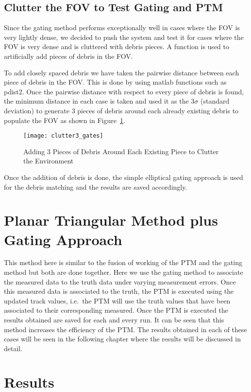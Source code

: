 \documentclass[]{aiaa-tc}%
\begin{document}
\subsection{Clutter the FOV to Test Gating and PTM}

Since the gating method performs exceptionally well in cases where the FOV is very lightly dense, we decided to push the system and test it for cases where the FOV is very dense and is cluttered with debris pieces. A function is used to artificially add pieces of debris in the FOV. 

To add closely spaced debris we have taken the pairwise distance between each piece of debris in the FOV. This is done by using matlab functions such as pdist2. Once the pairwise distance with respect to every piece of debris is found, the minimum distance in each case is taken and used it as the $3\sigma$ (standard deviation) to generate $3$ pieces of debris around each already existing debris to populate the FOV as shown in Figure~\ref{clutter}.
\begin{figure}[h]
\centering
\texttt{[image: clutter3\_gates]}
\caption{Adding 3 Pieces of Debris Around Each Existing Piece to Clutter the Environment}
\label{clutter}
\end{figure}
Once the addition of debris is done, the simple elliptical gating approach is used for the debris matching and the results are saved accordingly.

\section{Planar Triangular Method plus Gating Approach}

This method here is similar to the fusion of working of the PTM and the gating method but both are done together. Here we use the gating method to associate the measured data to the truth data under varying measurement errors. Once this measured data is associated to the truth, the PTM is executed using the updated track values, i.e.~the PTM will use the truth values that have been associated to their corresponding measured. Once the PTM is executed the results obtained are saved for each and every run. It can be seen that this method increases the efficiency of the PTM. The results obtained in each of these cases will be seen in the following chapter where the results will be discussed in detail.

\section{Results}
\end{document}
